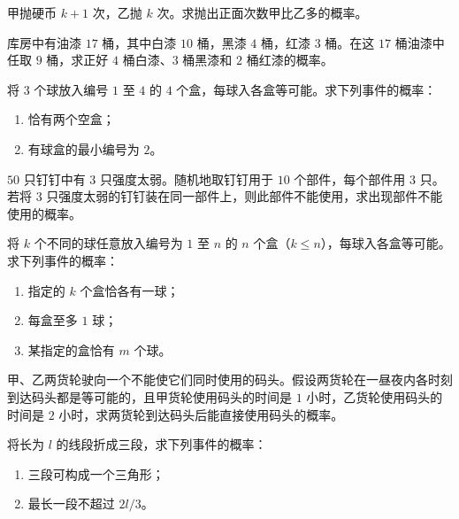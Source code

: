\begin{homework}[1.7]
甲抛硬币 $k+1$ 次，乙抛 $k$ 次。求抛出正面次数甲比乙多的概率。
\end{homework}

\begin{homework}[1.8]
库房中有油漆 $17$ 桶，其中白漆 $10$ 桶，黑漆 $4$ 桶，红漆 $3$ 桶。在这 $17$ 桶油漆中任取 $9$ 桶，求正好 $4$ 桶白漆、$3$ 桶黑漆和 $2$ 桶红漆的概率。
\end{homework}

\begin{homework}[1.9]
将 $3$ 个球放入编号 $1$ 至 $4$ 的 $4$ 个盒，每球入各盒等可能。求下列事件的概率：

\begin{enumerate}
  \item 恰有两个空盒；
  \item 有球盒的最小编号为 $2$。
\end{enumerate}
\end{homework}

\begin{homework}[1.10]
$50$ 只钉钉中有 $3$ 只强度太弱。随机地取钉钉用于 $10$ 个部件，每个部件用 $3$ 只。若将 $3$ 只强度太弱的钉钉装在同一部件上，则此部件不能使用，求出现部件不能使用的概率。
\end{homework}

\begin{homework}[1.11]
将 $k$ 个不同的球任意放入编号为 $1$ 至 $n$ 的 $n$ 个盒（$k \le n$），每球入各盒等可能。求下列事件的概率：

\begin{enumerate}
  \item 指定的 $k$ 个盒恰各有一球；
  \item 每盒至多 $1$ 球；
  \item 某指定的盒恰有 $m$ 个球。
\end{enumerate}
\end{homework}

\begin{homework}[1.12]
甲、乙两货轮驶向一个不能使它们同时使用的码头。假设两货轮在一昼夜内各时刻到达码头都是等可能的，且甲货轮使用码头的时间是 $1$ 小时，乙货轮使用码头的时间是 $2$ 小时，求两货轮到达码头后能直接使用码头的概率。
\end{homework}

\begin{homework}[1.13]
将长为 $l$ 的线段折成三段，求下列事件的概率：

\begin{enumerate}
  \item 三段可构成一个三角形；
  \item 最长一段不超过 $2l/3$。
\end{enumerate}
\end{homework}

